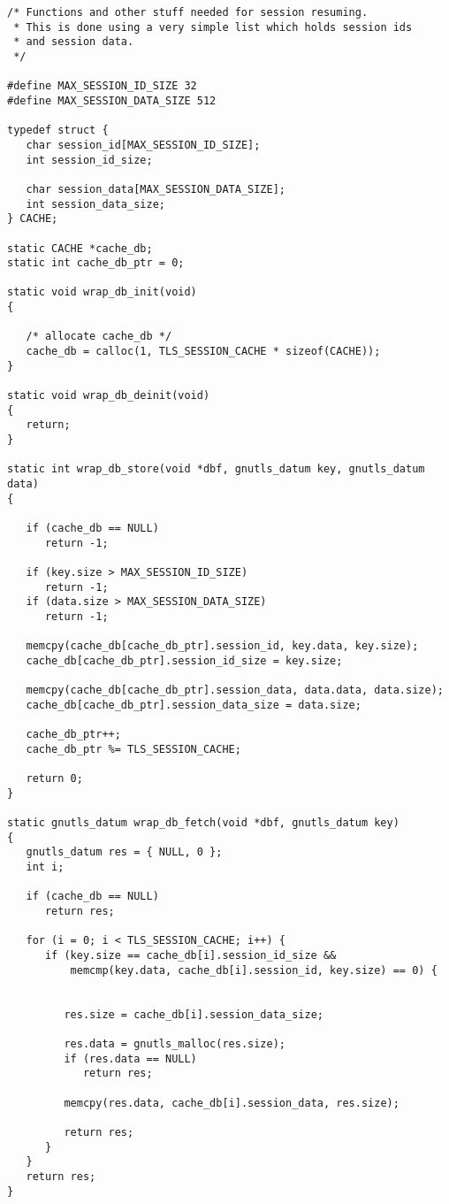 \begin{verbatim}
/* Functions and other stuff needed for session resuming.
 * This is done using a very simple list which holds session ids
 * and session data.
 */

#define MAX_SESSION_ID_SIZE 32
#define MAX_SESSION_DATA_SIZE 512

typedef struct {
   char session_id[MAX_SESSION_ID_SIZE];
   int session_id_size;

   char session_data[MAX_SESSION_DATA_SIZE];
   int session_data_size;
} CACHE;

static CACHE *cache_db;
static int cache_db_ptr = 0;

static void wrap_db_init(void)
{

   /* allocate cache_db */
   cache_db = calloc(1, TLS_SESSION_CACHE * sizeof(CACHE));
}

static void wrap_db_deinit(void)
{
   return;
}

static int wrap_db_store(void *dbf, gnutls_datum key, gnutls_datum data)
{

   if (cache_db == NULL)
      return -1;

   if (key.size > MAX_SESSION_ID_SIZE)
      return -1;
   if (data.size > MAX_SESSION_DATA_SIZE)
      return -1;

   memcpy(cache_db[cache_db_ptr].session_id, key.data, key.size);
   cache_db[cache_db_ptr].session_id_size = key.size;

   memcpy(cache_db[cache_db_ptr].session_data, data.data, data.size);
   cache_db[cache_db_ptr].session_data_size = data.size;

   cache_db_ptr++;
   cache_db_ptr %= TLS_SESSION_CACHE;

   return 0;
}

static gnutls_datum wrap_db_fetch(void *dbf, gnutls_datum key)
{
   gnutls_datum res = { NULL, 0 };
   int i;

   if (cache_db == NULL)
      return res;

   for (i = 0; i < TLS_SESSION_CACHE; i++) {
      if (key.size == cache_db[i].session_id_size &&
          memcmp(key.data, cache_db[i].session_id, key.size) == 0) {


         res.size = cache_db[i].session_data_size;

         res.data = gnutls_malloc(res.size);
         if (res.data == NULL)
            return res;

         memcpy(res.data, cache_db[i].session_data, res.size);

         return res;
      }
   }
   return res;
}


\end{verbatim}

